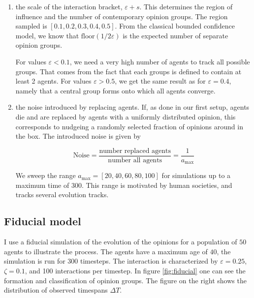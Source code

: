 \documentclass[useAMS,usenatbib]{mn2e}
\begin{document}
\begin{enumerate}
    \item the scale of the interaction bracket, $\varepsilon+s$. This
    determines the region of influence and the number of
    contemporary opinion groups. The region sampled is $[0.1, 0.2,
    0.3, 0.4, 0.5]$. From the classical bounded confidence model, we
    know that $\text{floor}(1/2\varepsilon)$ is the expected number of
    separate opinion groups.

    For values $\varepsilon<0.1$, we need a very high
    number of agents to track all possible groups. That comes from the
    fact that each groups is defined to contain at least 2
    agents. For values $\varepsilon>0.5$, we get the same result as
    for $\varepsilon=0.4$, namely that a central group forms onto which
    all agents converge.
    \item the noise introduced by replacing agents. If, as done in our
    first setup, agents die and are replaced by agents with a
    uniformly distributed opinion, this corresponds to nudgeing a
    randomly selected fraction of opinions around in the box. The
    introduced noise is given by

    \begin{equation}
        \text{Noise}=\frac{\text{number replaced agents}}{\text{number
            all
            agents}} = \frac{1}{a_\text{max}}
    \end{equation}

    We sweep the range $a_\text{max}=[20, 40, 60, 80, 100]$ for
    simulations up to a maximum time of 300. This range is motivated by
    human societies, and tracks several evolution tracks.

\end{enumerate}


\subsection{Fiducial model}

I use a fiducial simulation of the evolution of the opinions for a
population of $50$ agents to illustrate the process. The agents have a maximum
age of $40$, the simulation is run for 300 timesteps. The interaction is characterized by
$\varepsilon=0.25$, $\zeta=0.1$, and 100 interactions per timestep. In
figure \ref{fig:fiducial} one can see the formation and classification
of opinion groups. The figure on the right shows the distribution of observed timespans $\Delta T$.
\end{document}
